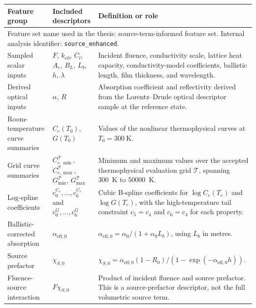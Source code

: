 \begin{tabular}{p{}p{}p{}}
\toprule
Feature group & Included descriptors & Definition or role \\
\midrule
\multicolumn{3}{p{0.92\textwidth}}{Feature set name used in the thesis: source-term-informed feature set. Internal analysis identifier: \texttt{source\_enhanced}.} \\
\midrule
Sampled scalar inputs & $F$, $k_{e0}$, $C_l$, $A_e$, $B_L$, $L_b$, $h$, $\lambda$ & Incident fluence, conductivity scale, lattice heat capacity, conductivity-model coefficients, ballistic length, film thickness, and wavelength. \\
Derived optical inputs & $\alpha$, $R$ & Absorption coefficient and reflectivity derived from the Lorentz--Drude optical descriptor sample at the reference state. \\
Room-temperature curve summaries & $C_e(T_0)$, $G(T_0)$ & Values of the nonlinear thermophysical curves at $T_0=\SI{300}{\kelvin}$. \\
Grid curve summaries & $C_{e,\min}^{\mathcal{T}}$, $C_{e,\max}^{\mathcal{T}}$, $G_{\min}^{\mathcal{T}}$, $G_{\max}^{\mathcal{T}}$ & Minimum and maximum values over the accepted thermophysical evaluation grid $\mathcal{T}$, spanning \SI{300}{\kelvin} to \SI{50000}{\kelvin}. \\
Log-spline coefficients & $c^{C_e}_0,\ldots,c^{C_e}_6$ and $c^G_0,\ldots,c^G_6$ & Cubic B-spline coefficients for $\log C_e(T_e)$ and $\log G(T_e)$, with the high-temperature tail constraint $c_5=c_4$ and $c_6=c_4$ for each property. \\
Ballistic-corrected absorption & $\alpha_{\mathrm{eff},0}$ & $\alpha_{\mathrm{eff},0}=\alpha_0/(1+\alpha_0 L_b)$, using $L_b$ in metres. \\
Source prefactor & $\chi_{S,0}$ & $\chi_{S,0}=\alpha_{\mathrm{eff},0}(1-R_0)/(1-\exp(-\alpha_{\mathrm{eff},0}h))$. \\
Fluence-source interaction & $F\chi_{S,0}$ & Product of incident fluence and source prefactor. This is a source-prefactor descriptor, not the full volumetric source term. \\
\bottomrule
\end{tabular}

